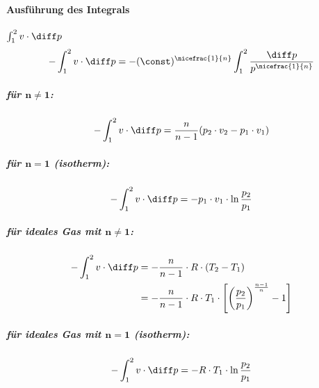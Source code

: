 			\paragraph{Ausführung des Integrals} %
				$\int_1^2 v \cdot \diff p$
				\[
					-\int_1^2 v \cdot \diff p = -(\const)^{\nicefrac{1}{n}} \int_1^2 \frac{\diff p}{p^{\nicefrac{1}{n}}}
				\]
				\subparagraph{für $\mathbold{n\neq 1}$:} %
					\[
						-\int_1^2 v \cdot \diff p = \frac{n}{n-1} (p_2 \cdot v_2 - p_1 \cdot v_1)
					\]
				\subparagraph{für $\mathbold{n = 1}$ (isotherm):} %
					\[
						-\int_1^2 v \cdot \diff p = -p_1 \cdot v_1 \cdot \ln \frac{p_2}{p_1}
					\]
				\subparagraph{für ideales Gas mit $\mathbold{n\neq 1}$:} %
					\begin{align*}
						-\int_1^2 v \cdot \diff p &= -\frac{n}{n-1} \cdot R \cdot (T_2 - T_1) \\
						&= -\frac{n}{n-1} \cdot R \cdot T_1 \cdot \left[
							\left(
								\frac{p_2}{p_1}
							\right)^{\frac{n-1}{n}}
							-1
						\right]
					\end{align*}
				\subparagraph{für ideales Gas mit $\mathbold{n = 1}$ (isotherm):} %
					\[
						-\int_1^2 v \cdot \diff p = -R \cdot T_1 \cdot \ln \frac{p_2}{p_1}
					\]
